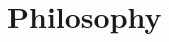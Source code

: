 \documentclass[../my_knowledge.tex]{subfiles}
\begin{document}
\chapter{Philosophy}

\newpage
\minitoc
\newpage


\end{document}
